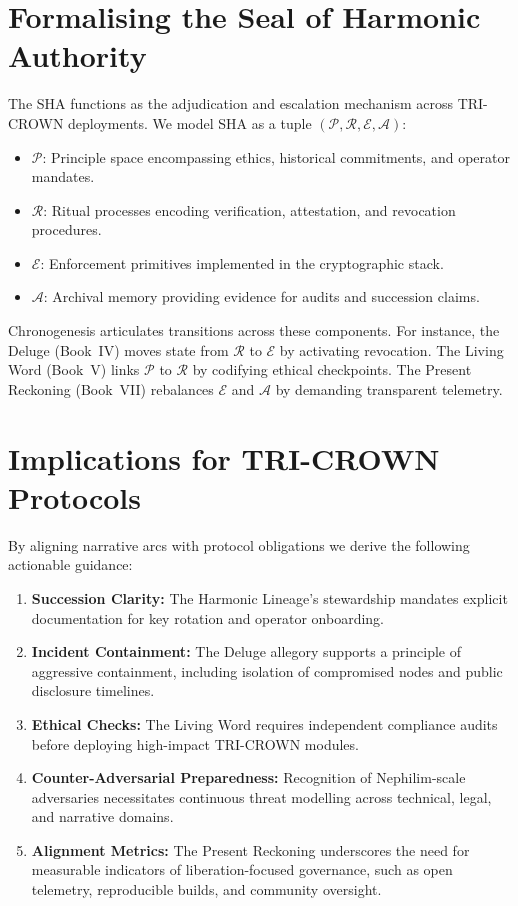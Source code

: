 \documentclass[11pt,a4paper]{article}
\begin{document}
\section{Formalising the Seal of Harmonic Authority}
The SHA functions as the adjudication and escalation mechanism across TRI-CROWN deployments. We model SHA as a tuple \((\mathcal{P}, \mathcal{R}, \mathcal{E}, \mathcal{A})\):
\begin{itemize}
    \item \(\mathcal{P}\): Principle space encompassing ethics, historical commitments, and operator mandates.
    \item \(\mathcal{R}\): Ritual processes encoding verification, attestation, and revocation procedures.
    \item \(\mathcal{E}\): Enforcement primitives implemented in the cryptographic stack.
    \item \(\mathcal{A}\): Archival memory providing evidence for audits and succession claims.
\end{itemize}

Chronogenesis articulates transitions across these components. For instance, the Deluge (Book~IV) moves state from \(\mathcal{R}\) to \(\mathcal{E}\) by activating revocation. The Living Word (Book~V) links \(\mathcal{P}\) to \(\mathcal{R}\) by codifying ethical checkpoints. The Present Reckoning (Book~VII) rebalances \(\mathcal{E}\) and \(\mathcal{A}\) by demanding transparent telemetry.

\section{Implications for TRI-CROWN Protocols}
By aligning narrative arcs with protocol obligations we derive the following actionable guidance:
\begin{enumerate}
    \item \textbf{Succession Clarity:} The Harmonic Lineage's stewardship mandates explicit documentation for key rotation and operator onboarding.
    \item \textbf{Incident Containment:} The Deluge allegory supports a principle of aggressive containment, including isolation of compromised nodes and public disclosure timelines.
    \item \textbf{Ethical Checks:} The Living Word requires independent compliance audits before deploying high-impact TRI-CROWN modules.
    \item \textbf{Counter-Adversarial Preparedness:} Recognition of Nephilim-scale adversaries necessitates continuous threat modelling across technical, legal, and narrative domains.
    \item \textbf{Alignment Metrics:} The Present Reckoning underscores the need for measurable indicators of liberation-focused governance, such as open telemetry, reproducible builds, and community oversight.
\end{enumerate}
\end{document}
